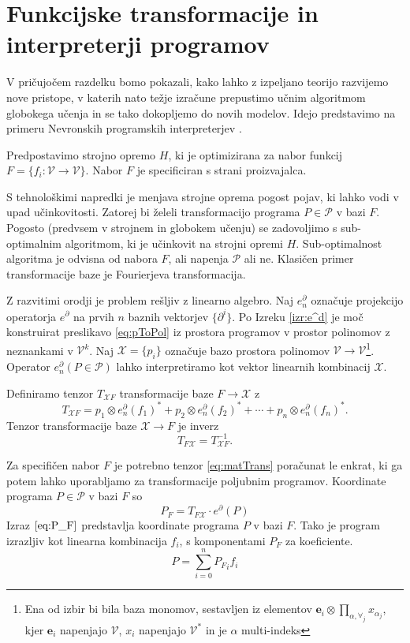 \documentclass[a4paper, 12pt]{book}
\newcommand{\VV}{\mathcal{V}}
\newcommand{\e}{\mathbf{e}}
\newcommand{\X}{\mathcal{X}}
\newcommand{\dP}{\mathcal{P}}
\newcommand{\D}{\partial}
\begin{document}
\section{Funkcijske transformacije in interpreterji programov}\label{sec:FunTrans}

V pričujočem razdelku bomo pokazali, kako lahko z izpeljano teorijo razvijemo nove pristope, v katerih nato težje izračune prepustimo učnim algoritmom globokega učenja in se tako dokopljemo do novih modelov. Idejo predstavimo na primeru Nevronskih programskih interpreterjev \cite{progInterp}.

Predpostavimo strojno opremo $H$, ki je optimizirana za nabor funkcij
   $F=\{f_i:\VV\to \VV\}$. Nabor $F$ je specificiran s strani proizvajalca.  
   
   S tehnološkimi napredki je menjava strojne oprema pogost pojav, ki lahko vodi v upad učinkovitosti. Zatorej bi želeli transformacijo programa $P\in\dP$ v bazi $F$. Pogosto (predvsem v strojnem in globokem učenju) se zadovoljimo s sub-optimalnim algoritmom, ki je učinkovit na strojni opremi $H$. Sub-optimalnost algoritma je odvisna od nabora $F$, ali napenja $\dP$ ali ne. Klasičen primer transformacije baze je Fourierjeva transformacija.

Z razvitimi orodji je problem rešljiv z linearno algebro. Naj $e^\D_n$ označuje projekcijo operatorja $e^\D$ na prvih $n$ baznih vektorjev $\{\D^i\}$. Po Izreku \ref{izr:e^d} je moč konstruirat preslikavo \eqref{eq:pToPol} iz prostora programov v prostor polinomov z neznankami v $\VV^k$. Naj $\X=\{p_i\}$ označuje bazo prostora polinomov $\VV\to \VV$\footnote{Ena od izbir bi bila baza monomov,
sestavljen iz elementov  $\e_i\otimes\prod\limits_{\alpha,\forall_j}
   x_{\alpha_j}$, kjer $\e_i$ napenjajo $\VV$, $x_i$ napenjajo $\VV^*$ in je $\alpha$
   multi-indeks}. Operator $e^\D_n(P\in\dP)$ lahko interpretiramo kot vektor linearnih kombinacij $\X$.
   
Definiramo tenzor $T_{\X F}$ transformacije baze $F\to\X$ z
  \begin{equation}\label{eq:matTransF}
  T_{\X F}=
  p_1\otimes e_n^\D(f_1)^* + p_2\otimes e_n^\D(f_2)^* + \cdots + p_n\otimes e_n^\D(f_n)^*.
  \end{equation}
Tenzor transformacije baze $\X\to F$ je inverz
  \begin{equation}\label{eq:matTrans}
  T_{F\X}=T_{\X F}^{-1}.
  \end{equation}
  
Za specifičen nabor $F$ je potrebno tenzor \eqref{eq:matTrans} poračunat le enkrat, ki ga potem lahko uporabljamo za transformacije poljubnim programov. Koordinate programa $P\in\dP$ v bazi $F$ so
\begin{equation}\label{eq:P_F}
  	P_F=T_{F\X}\cdot e^\D(P)
  \end{equation}
Izraz $\eqref{eq:P_F}$ predstavlja koordinate programa $P$ v bazi $F$. Tako je program izrazljiv kot linearna kombinacija $f_i$, s komponentami $P_F$ za koeficiente.
  \begin{equation*}
  P=\sum\limits_{i=0}^{n}{P_F}_if_i
  \end{equation*}
  
\end{document}
